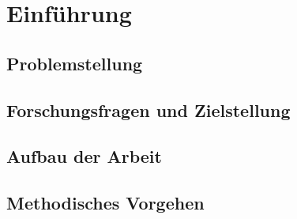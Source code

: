 \chapter{Einführung}


\todots

\section{Problemstellung}

\todots

\section{Forschungsfragen und Zielstellung}


\todots

\section{Aufbau der Arbeit}


\todots

\section{Methodisches Vorgehen}


\todots

